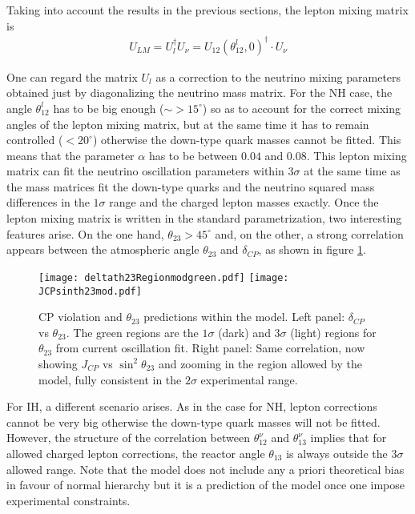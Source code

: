 \documentclass[english,10pt,aps,prd,a4paper,preprintnumbers,floatfix,nofootinbib,showpacs,superscriptaddress]{revtex4-1}
\begin{document}
Taking into account the results in the previous sections, the lepton
mixing matrix is
%
\begin{eqnarray}
U_{LM} = U_l^\dagger U_\nu = U_{12}\left(\theta^l_{12}, 0\right)^\dagger  \cdot U_{\nu}
\end{eqnarray}

One can regard the matrix $U_l$ as a correction to the neutrino
mixing parameters obtained just by diagonalizing the neutrino mass
matrix.
%
%
For the NH case, the angle $\theta_{12}^l$ has to be big enough
($\sim >15 ^{\circ}$) so as to account for the correct mixing angles
of the lepton mixing matrix, but at the same time it has to remain
controlled ($< 20^{\circ}$) otherwise the down-type quark masses
cannot be fitted. This means that the parameter $\alpha$ has to be
between $0.04$ and $0.08$.
%
This lepton mixing matrix can fit the neutrino oscillation parameters
within $3 \sigma$ at the same time as the mass matrices fit the
down-type quarks and the neutrino squared mass differences in the
$1\sigma$ range and the charged lepton masses exactly. Once the lepton
mixing matrix is written in the standard parametrization, two
interesting features arise. On the one hand, $\theta_{23}>45^{\circ}$
and, on the other, a strong correlation appears between the
atmospheric angle $\theta_{23}$ and $\delta_{CP}$, as shown in figure
\ref{fig:theta23vsdelta}.
  \begin{figure}[!h]
 \centering
  \texttt{[image: deltath23Regionmodgreen.pdf]}
  \texttt{[image: JCPsinth23mod.pdf]}
  \caption{CP violation and $\theta_{23}$ predictions within the
    model. Left panel: $\delta_{CP}$ vs $\theta_{23}$. The green
    regions are the $1\sigma$ (dark) and $3\sigma$ (light) regions for
    $\theta_{23}$ from current oscillation fit. Right panel: Same
    correlation, now showing $J_{CP}$ vs $\sin^2 \theta_{23}$ and
    zooming in the region allowed by the model, fully consistent in
    the $2\sigma$ experimental range.}
    \label{fig:theta23vsdelta}
  \end{figure}
  
  For IH, a different scenario arises. As in the case for NH, lepton
  corrections cannot be very big otherwise the down-type quark masses
  will not be fitted. However, the structure of the correlation
  between $\theta_{12}^\nu$ and $\theta_{13}^\nu$ implies that for
  allowed charged lepton corrections, the reactor angle $\theta_{13}$
  is always outside the $3\sigma$ allowed range. Note that the model
  does not include any a priori theoretical bias in favour of normal
  hierarchy but it is a prediction of the model once one impose
  experimental constraints.
\end{document}
